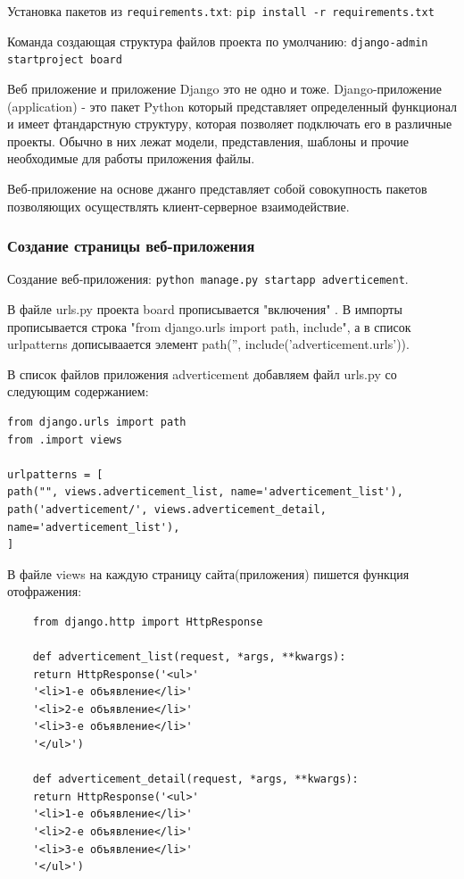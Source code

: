 \documentclass[%
	11pt,
	a4paper,
	utf8,
		]{article}
\begin{document}
Установка пакетов из \texttt{requirements.txt}: \lstinline{pip install -r requirements.txt}

Команда создающая структура файлов проекта по умолчанию: \lstinline{django-admin startproject board}

Веб приложение и приложение Django это не одно и тоже. Django-приложение (application) - это пакет Python который представляет определенный функционал и имеет фтандарстную структуру, которая позволяет подключать его в различные проекты. Обычно в них лежат модели, представления, шаблоны и прочие необходимые для работы приложения файлы. 

Веб-приложение на основе джанго представляет собой совокупность пакетов позволяющих осуществлять клиент-серверное взаимодействие.

\subsubsection{Создание страницы веб-приложения}

Создание веб-приложения:  \lstinline{python manage.py startapp adverticement}.  

В файле urls.py проекта board прописывается "включения" . В импорты прописывается строка "from django.urls import path, include", а в список urlpatterns дописываается элемент path('', include('adverticement.urls')).

В список файлов приложения adverticement добавляем файл urls.py со следующим содержанием: 

\begin{lstlisting}
from django.urls import path
from .import views

urlpatterns = [
path("", views.adverticement_list, name='adverticement_list'),
path('adverticement/', views.adverticement_detail, name='adverticement_list'),
]
\end{lstlisting}

В файле views на каждую страницу сайта(приложения) пишется функция отофражения:

\begin{lstlisting}
	from django.http import HttpResponse
	
	def adverticement_list(request, *args, **kwargs):
	return HttpResponse('<ul>'
	'<li>1-е объявление</li>'
	'<li>2-е объявление</li>'
	'<li>3-е объявление</li>'
	'</ul>')
	
	def adverticement_detail(request, *args, **kwargs):
	return HttpResponse('<ul>'
	'<li>1-е объявление</li>'
	'<li>2-е объявление</li>'
	'<li>3-е объявление</li>'
	'</ul>')
\end{lstlisting}
\end{document}
